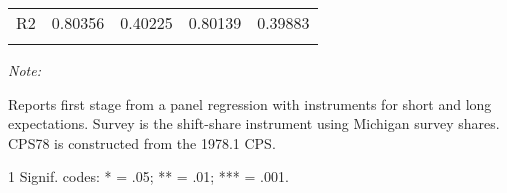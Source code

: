 \begin{table}
{\begin{threeparttable}
\begin{tabular}[t]{lllll}
\addlinespace
R2 & 0.80356 & 0.40225 & 0.80139 & 0.39883\\
\addlinespace
\cellcolor{gray!6}{Within R2} & \cellcolor{gray!6}{0.13753} & \cellcolor{gray!6}{0.04049} & \cellcolor{gray!6}{0.12800} & \cellcolor{gray!6}{0.03500}\\
\bottomrule
\end{tabular}
\begin{tablenotes}
\item \textit{Note: } 
\item Reports first stage from a panel regression with instruments for short and long expectations. Survey is the shift-share instrument using Michigan survey shares. CPS78 is constructed from the 1978.1 CPS.
\item[1] Signif. codes: * = .05; ** = .01; *** = .001.
\end{tablenotes}
\end{threeparttable}}
\end{table}
